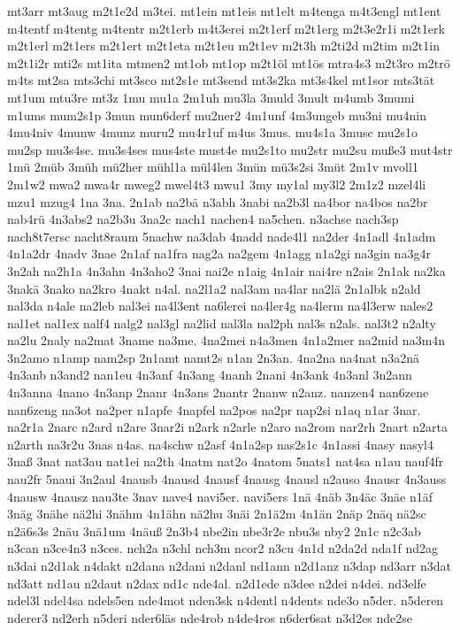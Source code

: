 {mt3arr
mt3aug
m2t1e2d
m3tei.
mt1ein
mt1eis
mt1elt
m4tenga
m4t3engl
mt1ent
m4tentf
m4tentg
m4tentr
m2t1erb
m4t3erei
m2t1erf
m2t1erg
m2t3e2r1i
m2t1erk
m2t1erl
m2t1ers
m2t1ert
m2t1eta
m2t1eu
m2t1ev
m2t3h
m2ti2d
m2tim
m2t1in
m2t1i2r
mti2s
mt1ita
mtmen2
mt1ob
mt1op
m2t1öl
mt1ös
mtra4s3
m2t3ro
m2trö
m4ts
mt2sa
mts3chi
mt3sco
mt2s1e
mt3send
mt3s2ka
mt3s4kel
mt1sor
mts3tät
mt1um
mtu3re
mt3z
1mu
mu1a
2m1uh
mu3la
3muld
3mult
m4umb
3mumi
m1ums
mum2s1p
3mun
mun6derf
mu2ner2
4m1unf
4m3ungeb
mu3ni
mu4nin
4mu4niv
4munw
4munz
muru2
mu4r1uf
m4us
3mus.
mu4s1a
3musc
mu2s1o
mu2sp
mu3s4se.
mu3s4ses
mus4ste
must4e
mu2s1to
mu2str
mu2su
muße3
mut4str
1mü
2müb
3müh
mü2her
mühl1a
mül4len
3mün
mü3s2si
3müt
2m1v
mvoll1
2m1w2
mwa2
mwa4r
mweg2
mwel4t3
mwu1
3my
my1al
my3l2
2m1z2
mzel4li
mzu1
mzug4
1na
3na.
2n1ab
na2bä
n3abh
3nabi
na2b3l
na4bor
na4bos
na2br
nab4rü
4n3abs2
na2b3u
3na2c
nach1
nachen4
na5chen.
n3achse
nach3sp
nach8t7ersc
nacht8raum
5nachw
na3dab
4nadd
nade4l1
na2der
4n1adl
4n1adm
4n1a2dr
4nadv
3nae
2n1af
na1fra
nag2a
na2gem
4n1agg
n1a2gi
na3gin
na3g4r
3n2ah
na2h1a
4n3ahn
4n3aho2
3nai
nai2e
n1aig
4n1air
nai4re
n2ais
2n1ak
na2ka
3nakä
3nako
na2kro
4nakt
n4al.
na2l1a2
nal3am
na4lar
na2lä
2n1albk
n2ald
nal3da
n4ale
na2leb
nal3ei
na4l3ent
na6lerei
na4ler4g
na4lerm
na4l3erw
nales2
nal1et
nal1ex
nalf4
nalg2
nal3gl
na2lid
nal3la
nal2ph
nal3s
n2als.
nal3t2
n2alty
na2lu
2naly
na2mat
3name
na3me.
4na2mei
n4a3men
4n1a2mer
na2mid
na3m4n
3n2amo
n1amp
nam2sp
2n1amt
namt2s
n1an
2n3an.
4na2na
na4nat
n3a2nä
4n3anb
n3and2
nan1eu
4n3anf
4n3ang
4nanh
2nani
4n3ank
4n3anl
3n2ann
4n3anna
4nano
4n3anp
2nanr
4n3ans
2nantr
2nanw
n2anz.
nanzen4
nan6zene
nan6zeng
na3ot
na2per
n1apfe
4napfel
na2pos
na2pr
nap2si
n1aq
n1ar
3nar.
na2r1a
2narc
n2ard
n2are
3nar2i
n2ark
n2arle
n2aro
na2rom
nar2rh
2nart
n2arta
n2arth
na3r2u
3nas
n4as.
na4schw
n2asf
4n1a2sp
nas2s1c
4n1assi
4nasy
nasyl4
3naß
3nat
nat3au
nat1ei
na2th
4natm
nat2o
4natom
5nats1
nat4sa
n1au
nauf4fr
nau2fr
5naui
3n2aul
4nausb
4nausd
4nausf
4nausg
4nausl
n2auso
4nausr
4n3auss
4nausw
4nausz
nau3te
3nav
nave4
navi5er.
navi5ers
1nä
4näb
3n4äc
3näe
n1äf
3näg
3nähe
nä2hi
3nähm
4n1ähn
nä2hu
3näi
2n1ä2m
4n1än
2näp
2näq
nä2sc
n2ä6s3s
2näu
3nä1um
4näuß
2n3b4
nbe2in
nbe3r2e
nbu3s
nby2
2n1c
n2c3ab
n3can
n3ce4n3
n3ces.
nch2a
n3chl
nch3m
ncor2
n3cu
4n1d
n2da2d
nda1f
nd2ag
n3dai
n2d1ak
n4dakt
n2dana
n2dani
n2danl
nd1ann
n2d1anz
n3dap
nd3arr
n3dat
nd3att
nd1au
n2daut
n2dax
nd1c
nde4al.
n2d1ede
n3dee
n2dei
n4dei.
nd3elfe
ndel3l
ndel4sa
ndels5en
nde4mot
nden3sk
n4dentl
n4dents
nde3o
n5der.
n5deren
nderer3
nd2erh
n5deri
nder6läs
nde4rob
n4de4ros
n6der6sat
n3d2es
nde2se
}
